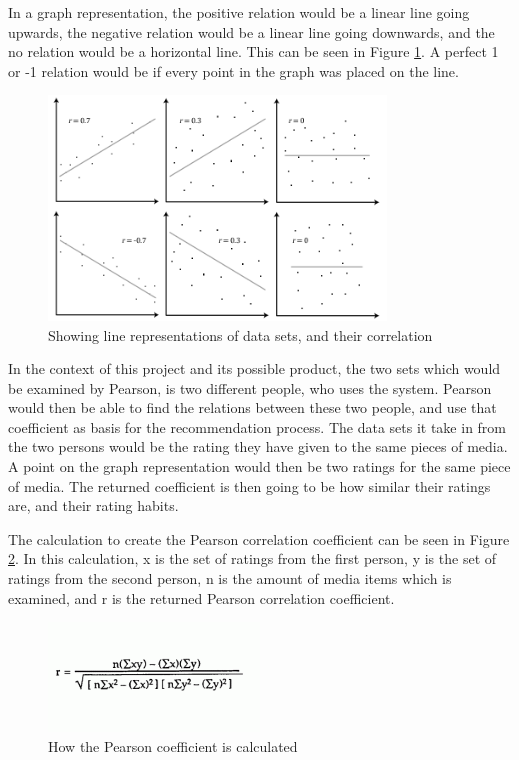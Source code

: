 In a graph representation, the positive relation would be a linear line going upwards, the negative relation would be a linear line going downwards, and the no relation would be a horizontal line. This can be seen in Figure \ref{Pearson1}. A perfect 1 or -1 relation would be if every point in the graph was placed on the line. \cite{Pearson1}

\begin{figure}[htb]
\centering
\includegraphics[width=0.8\textwidth]{Images/pearson1.png}
\caption{Showing line representations of data sets, and their correlation \cite{Pearson2}}
\label{Pearson1}
\end{figure}

In the context of this project and its possible product, the two sets which would be examined by Pearson, is two different people, who uses the system. Pearson would then be able to find the relations between these two people, and use that coefficient as basis for the recommendation process. The data sets it take in from the two persons would be the rating they have given to the same pieces of media. A point on the graph representation would then be two ratings for the same piece of media. The returned coefficient is then going to be how similar their ratings are, and their rating habits.

The calculation to create the Pearson correlation coefficient can be seen in Figure \ref{PearsonCalc}. In this calculation, x is the set of ratings from the first person, y is the set of ratings from the second person, n is the amount of media items which is examined, and r is the returned Pearson correlation coefficient. \cite{Pearson1}

\begin{figure}[htb]
\centering
\includegraphics[width=0.5\textwidth]{Images/pearsonCalc.png}
\caption{How the Pearson coefficient is calculated \cite{Pearson1}}
\label{PearsonCalc}
\end{figure}

